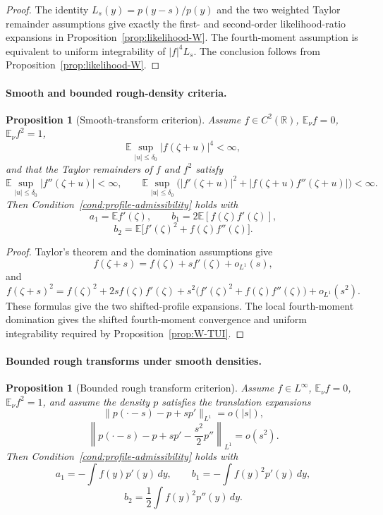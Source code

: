 \documentclass[10pt,a4paper]{amsart}
\newtheorem{proposition}[theorem]{Proposition}
\newcommand{\E}{\mathbb E}
\begin{document}
\begin{proof}
The identity \(L_s(y)=p(y-s)/p(y)\) and the two weighted Taylor remainder assumptions give exactly the first- and second-order likelihood-ratio expansions in Proposition~\ref{prop:likelihood-W}.  The fourth-moment assumption is equivalent to uniform integrability of \(|f|^4L_s\).  The conclusion follows from Proposition~\ref{prop:likelihood-W}.
\end{proof}

\paragraph{Smooth and bounded rough-density criteria.}

\begin{proposition}[Smooth-transform criterion]
\label{prop:smooth-transform-W}
Assume \(f\in C^2(\mathbb R)\), \(\E_\nu f=0\),
\(\E_\nu f^2=1\),
\[
        \E\sup_{|u|\le\delta_0}|f(\zeta+u)|^4<\infty,
\]
and that the Taylor remainders of \(f\) and \(f^2\) satisfy
\[
        \E\sup_{|u|\le\delta_0}|f''(\zeta+u)|<\infty,
        \qquad
        \E\sup_{|u|\le\delta_0}\bigl(|f'(\zeta+u)|^2+|f(\zeta+u)f''(\zeta+u)|\bigr)<\infty.
\]
Then Condition~\ref{cond:profile-admissibility} holds with
\[
        a_1=\E f'(\zeta),
        \qquad
        b_1=2\E[f(\zeta)f'(\zeta)],
\]
\[
        b_2=\E\bigl[f'(\zeta)^2+f(\zeta)f''(\zeta)\bigr].
\]
\end{proposition}

\begin{proof}
Taylor's theorem and the domination assumptions give
\[
        f(\zeta+s)=f(\zeta)+sf'(\zeta)+o_{L^1}(s),
\]
and
\[
        f(\zeta+s)^2=f(\zeta)^2+2sf(\zeta)f'(\zeta)
        +s^2\bigl(f'(\zeta)^2+f(\zeta)f''(\zeta)\bigr)+o_{L^1}(s^2).
\]
These formulas give the two shifted-profile expansions.  The local fourth-moment domination gives the shifted fourth-moment convergence and uniform integrability required by Proposition~\ref{prop:W-TUI}.
\end{proof}

\paragraph{Bounded rough transforms under smooth densities.}

\begin{proposition}[Bounded rough transform criterion]
\label{prop:bounded-rough-W}
Assume \(f\in L^\infty\), \(\E_\nu f=0\), \(\E_\nu f^2=1\), and assume the density \(p\) satisfies the translation expansions
\[
        \|p(\cdot-s)-p+s p'\|_{L^1}=o(|s|),
\]
\[
        \left\|p(\cdot-s)-p+s p'-\frac{s^2}{2}p''\right\|_{L^1}=o(s^2).
\]
Then Condition~\ref{cond:profile-admissibility} holds with
\[
        a_1=-\int f(y)p'(y)\,dy,
        \qquad
        b_1=-\int f(y)^2p'(y)\,dy,
\]
\[
        b_2=\frac12\int f(y)^2p''(y)\,dy.
\]
\end{proposition}
\end{document}
